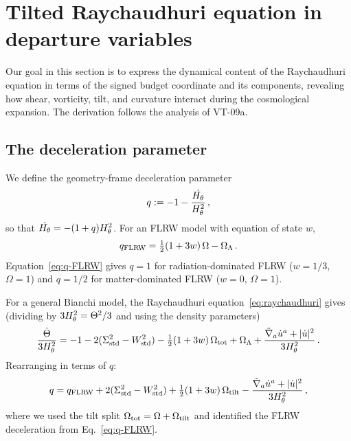 \section{Tilted Raychaudhuri equation in departure variables}
\label{sec:tilt-raych}

Our goal in this section is to express the dynamical content
of the Raychaudhuri equation in terms of the signed budget coordinate
and its components, revealing how shear, vorticity, tilt, and
curvature interact during the cosmological expansion.  The
derivation follows the analysis of VT-09a.


\subsection{The deceleration parameter}\label{sec:decel-param}

We define the geometry-frame deceleration parameter
\begin{equation}\label{eq:q-def}
q := -1 - \frac{\dot{H_\theta}}{H_\theta^2}\,,
\end{equation}
so that $\dot{H_\theta} = -(1+q)H_\theta^2$.
For an FLRW model with equation of state $w$,
\begin{equation}\label{eq:q-FLRW}
q_{\mathrm{FLRW}} = \tfrac{1}{2}(1+3w)\,\Omega
  - \Omega_\Lambda\,.
\end{equation}
Equation~\eqref{eq:q-FLRW} gives $q = 1$ for radiation-dominated FLRW ($w = 1/3$,
$\Omega = 1$) and $q = 1/2$ for matter-dominated FLRW
($w = 0$, $\Omega = 1$).

For a general Bianchi model, the Raychaudhuri
equation~\eqref{eq:raychaudhuri} gives (dividing by
$3H_\theta^2 = \Theta^2/3$ and using the density
parameters)
\begin{equation}\label{eq:raych-normalised}
\frac{\dot{\Theta}}{3H_\theta^2}
= -1 - 2(\Sigma^2_{\mathrm{std}} - W^2_{\mathrm{std}})
  - \tfrac{1}{2}(1+3w)\,\Omega_{\mathrm{tot}}
  + \Omega_\Lambda
  + \frac{\tilde{\nabla}_a\dot{u}^a + |\dot{u}|^2}{3H_\theta^2}\,.
\end{equation}
Rearranging in terms of $q$:
\begin{equation}\label{eq:q-general}
q = q_{\mathrm{FLRW}}
  + 2(\Sigma^2_{\mathrm{std}} - W^2_{\mathrm{std}})
  + \tfrac{1}{2}(1+3w)\,\Omega_{\mathrm{tilt}}
  - \frac{\tilde{\nabla}_a\dot{u}^a
    + |\dot{u}|^2}{3H_\theta^2}\,,
\end{equation}
where we used the tilt split $\Omega_{\mathrm{tot}}
= \Omega + \Omega_{\mathrm{tilt}}$ and identified the FLRW deceleration
from Eq.~\eqref{eq:q-FLRW}.

